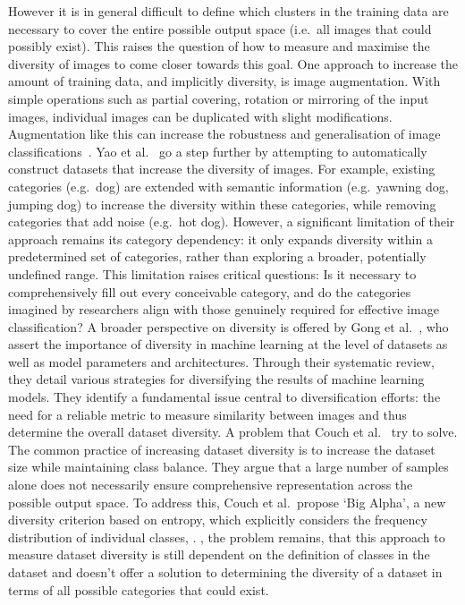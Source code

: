 However it is in general difficult to define which clusters in the training data are necessary to cover the entire possible output space (i.e.\ all images that could possibly exist). This raises the question of how to measure and maximise the diversity of images to come closer towards this goal. One approach to increase the amount of training data, and implicitly diversity, is image augmentation. With simple operations such as partial covering, rotation or mirroring of the input images, individual images can be duplicated with slight modifications. Augmentation like this can increase the robustness and generalisation of image classifications~\cite{shortenSurveyImageData2019}. Yao et al.~\cite{yaoAutomaticConstructionDiverse2017} go a step further by attempting to automatically construct datasets that increase the diversity of images. For example, existing categories (e.g.\ dog) are extended with semantic information (e.g.\ yawning dog, jumping dog) to increase the diversity within these categories, while removing categories that add noise (e.g.\ hot dog). However, a significant limitation of their approach remains its category dependency: it only expands diversity within a predetermined set of categories, rather than exploring a broader, potentially undefined range. This limitation raises critical questions: Is it necessary to comprehensively fill out every conceivable category, and do the categories imagined by researchers align with those genuinely required for effective image classification? A broader perspective on diversity is offered by Gong et al.~\cite{gongDiversityMachineLearning2019}, who assert the importance of diversity in machine learning at the level of datasets as well as model parameters and architectures. Through their systematic review, they detail various strategies for diversifying the results of machine learning models. They identify a fundamental issue central to diversification efforts: the need for a reliable metric to measure similarity between images and thus determine the overall dataset diversity. A problem that Couch et al.~\cite{couchSizeClassBalance2024} try to solve. The common practice of increasing dataset diversity is to increase the dataset size while maintaining class balance. They argue that a large number of samples alone does not necessarily ensure comprehensive representation across the possible output space. To address this, Couch et al.\ propose `Big Alpha', a new diversity criterion based on entropy, which explicitly considers the frequency distribution of individual classes, . , the problem remains, that this approach to measure dataset diversity is still dependent on the definition of classes in the dataset and doesn't offer a solution to determining the diversity of a dataset in terms of all possible categories that could exist. 

